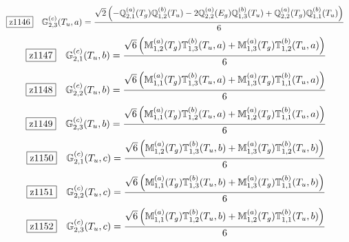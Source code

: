 \documentclass[fleqn,10pt,landscape]{jsarticle}
\begin{document}
\begin{dmath*}
\hspace*{3mm}\fbox{z1146}\quad \mathbb{G}_{2,3}^{(c)}(T_{u},a)=\frac{\sqrt{2} \left(- \mathbb{Q}_{2,1}^{(a)}(T_{g}) \mathbb{Q}_{1,2}^{(b)}(T_{u}) - 2 \mathbb{Q}_{2,2}^{(a)}(E_{g}) \mathbb{Q}_{1,3}^{(b)}(T_{u}) + \mathbb{Q}_{2,2}^{(a)}(T_{g}) \mathbb{Q}_{1,1}^{(b)}(T_{u})\right)}{6}
\end{dmath*}
\begin{dmath*}
\hspace*{3mm}\fbox{z1147}\quad \mathbb{G}_{2,1}^{(c)}(T_{u},b)=\frac{\sqrt{6} \left(\mathbb{M}_{1,2}^{(a)}(T_{g}) \mathbb{T}_{1,3}^{(b)}(T_{u},a) + \mathbb{M}_{1,3}^{(a)}(T_{g}) \mathbb{T}_{1,2}^{(b)}(T_{u},a)\right)}{6}
\end{dmath*}
\begin{dmath*}
\hspace*{3mm}\fbox{z1148}\quad \mathbb{G}_{2,2}^{(c)}(T_{u},b)=\frac{\sqrt{6} \left(\mathbb{M}_{1,1}^{(a)}(T_{g}) \mathbb{T}_{1,3}^{(b)}(T_{u},a) + \mathbb{M}_{1,3}^{(a)}(T_{g}) \mathbb{T}_{1,1}^{(b)}(T_{u},a)\right)}{6}
\end{dmath*}
\begin{dmath*}
\hspace*{3mm}\fbox{z1149}\quad \mathbb{G}_{2,3}^{(c)}(T_{u},b)=\frac{\sqrt{6} \left(\mathbb{M}_{1,1}^{(a)}(T_{g}) \mathbb{T}_{1,2}^{(b)}(T_{u},a) + \mathbb{M}_{1,2}^{(a)}(T_{g}) \mathbb{T}_{1,1}^{(b)}(T_{u},a)\right)}{6}
\end{dmath*}
\begin{dmath*}
\hspace*{3mm}\fbox{z1150}\quad \mathbb{G}_{2,1}^{(c)}(T_{u},c)=\frac{\sqrt{6} \left(\mathbb{M}_{1,2}^{(a)}(T_{g}) \mathbb{T}_{1,3}^{(b)}(T_{u},b) + \mathbb{M}_{1,3}^{(a)}(T_{g}) \mathbb{T}_{1,2}^{(b)}(T_{u},b)\right)}{6}
\end{dmath*}
\begin{dmath*}
\hspace*{3mm}\fbox{z1151}\quad \mathbb{G}_{2,2}^{(c)}(T_{u},c)=\frac{\sqrt{6} \left(\mathbb{M}_{1,1}^{(a)}(T_{g}) \mathbb{T}_{1,3}^{(b)}(T_{u},b) + \mathbb{M}_{1,3}^{(a)}(T_{g}) \mathbb{T}_{1,1}^{(b)}(T_{u},b)\right)}{6}
\end{dmath*}
\begin{dmath*}
\hspace*{3mm}\fbox{z1152}\quad \mathbb{G}_{2,3}^{(c)}(T_{u},c)=\frac{\sqrt{6} \left(\mathbb{M}_{1,1}^{(a)}(T_{g}) \mathbb{T}_{1,2}^{(b)}(T_{u},b) + \mathbb{M}_{1,2}^{(a)}(T_{g}) \mathbb{T}_{1,1}^{(b)}(T_{u},b)\right)}{6}
\end{dmath*}
\end{document}
